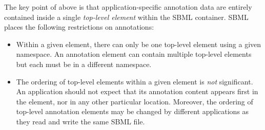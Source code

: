 The key point of  above is that application-specific
annotation data are entirely contained inside a single
\emph{top-level element} within the SBML 
container.  SBML \thisLV places the following
restrictions on annotations:
\begin{itemize}

\item Within a given  element, there can
  only be one top-level element using a given namespace.  An
  annotation element can contain multiple top-level elements but
  each must be in a different namespace.

  
\item The ordering of top-level elements within a given
   element is \emph{not} significant.  An
  application should not expect that its annotation content
  appears first in the  element, nor in any
  other particular location.  Moreover, the ordering of
    top-level annotation elements may be changed by
  different applications as they read and write the same
    SBML file.

\end{itemize}

